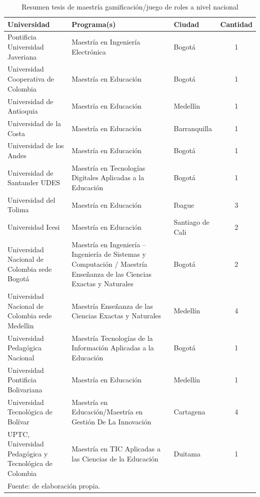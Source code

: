\begin{table}[!htb]
\caption{Resumen tesis de maestría gamificación/juego de roles a nivel nacional}
\label{tab:resumenlocal}
\begin{center}
\footnotesize
\begin{tabular}{ p{50mm} p{50mm} p{15mm} c}
\toprule
	\textbf{Universidad} & \textbf{Programa(s)} & \textbf{Ciudad} & \textbf{Cantidad}\\ 
\midrule
	Pontificia Universidad Javeriana & Maestría en Ingeniería Electrónica & Bogotá & 1\\
	Universidad Cooperativa de Colombia & Maestría en Educación & Bogotá & 1\\
	Universidad de Antioquia & Maestría en Educación & Medellín & 1\\
	Universidad de la Costa & Maestría en Educación & Barranquilla & 1\\
	Universidad de los Andes & Maestría en Educación & Bogotá & 1\\
	Universidad de Santander UDES & Maestría en Tecnologías Digitales Aplicadas a la Educación & Bogotá & 
	1\\ 
	Universidad del Tolima & Maestría en Educación & Ibague & 3\\
	Universidad Icesi & Maestría en Educación & Santiago de Cali & 2\\
	Universidad Nacional de Colombia sede Bogotá & Maestría en Ingeniería – Ingeniería de Sistemas y 
		Computación / Maestría Enseñanza de las Ciencias Exactas y Naturales & Bogotá & 2\\
	Universidad Nacional de Colombia sede Medellin & Maestría Enseñanza de las Ciencias Exactas y 
		Naturales & Medellín & 4\\
	Universidad Pedagógica Nacional & Maestría Tecnologías de la Información Aplicadas a la Educación & 
		Bogotá & 1\\
	Universidad Pontificia Bolivariana & Maestría en Educación & Medellín & 1\\
	Universidad Tecnológica de Bolívar & Maestría en Educación/Maestría en Gestión De La Innovación & 
		Cartagena &  4\\
	UPTC, Universidad Pedagógica y Tecnológica de Colombia & Maestría en TIC Aplicadas a las Ciencias de 
		la Educación & Duitama & 1\\
\bottomrule
	\multicolumn{4}{l}{\footnotesize Fuente: de elaboración propia.}\\
\end{tabular}
\end{center}
\end{table}


